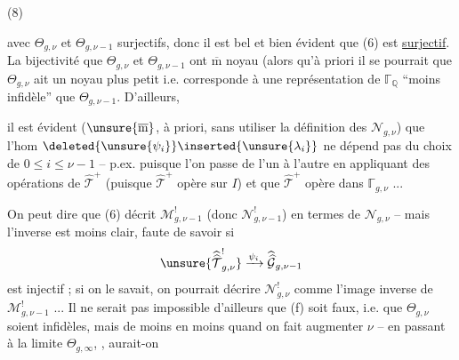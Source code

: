(8)\quad{}

avec $\Theta_{g,\nu}$ et $\Theta_{g,\nu-1}$ surjectifs, donc il est bel et bien évident que (6) est \uline{surjectif}. La bijectivité  que $\Theta_{g,\nu}$ et $\Theta_{g,\nu-1}$ ont $\overline{\mathrm m}$ noyau (alors qu'à priori il se pourrait que $\Theta_{g,\nu}$ ait un noyau plus petit i.e. corresponde à une représentation de $\mathbb{\Gamma}_{\mathbb Q}$ ``moins infidèle'' que $\Theta_{g,\nu-1}$. D'ailleurs,

il est évident  ($\unsure{\overline{\mathrm m}}$, à priori, sans utiliser la définition   des $\mathcal N_{g,\nu}$) que l'hom $\deleted{\unsure{\psi_i}}\inserted{\unsure{\lambda_i}}$  ne dépend pas du choix de $0\leq i\leq\nu-1$ -- p.ex. puisque l'on passe de l'un à l'autre en appliquant des opérations de $\widehat{\mathcal T}^{+}$ (puisque $\widehat{\mathcal T}^{+}$ opère  sur $I$) et que $\widehat{\mathcal T}^{+}$ opère  dans $\mathbb{\Gamma}_{g,\nu}$ ...

On peut dire que (6) décrit $\mathcal M_{g,\nu-1}^{!}$ (donc $\mathcal N_{g,\nu-1}^{!}$) en termes de $\mathcal N_{g,\nu}$ -- mais l'inverse est moins clair, faute de savoir si
\[
\unsure{\widehat{\widehat{\mathcal T}}_{g,\nu}^{!}}
\xrightarrow{\psi_i}
\widehat{\widehat{\mathcal G}}_{g,\nu-1}
\]
est injectif ; si on le savait, on pourrait décrire $\mathcal N_{g,\nu}^{!}$ comme l'image inverse de $\mathcal M_{g,\nu-1}^{!}$ ...  Il ne serait pas impossible d'ailleurs que (f) soit faux, i.e. que  $\Theta_{g,\nu}$ soient infidèles, mais de moins en moins quand on fait augmenter $\nu$ -- en passant à la limite  $\Theta_{g,\infty}$, , aurait-on

